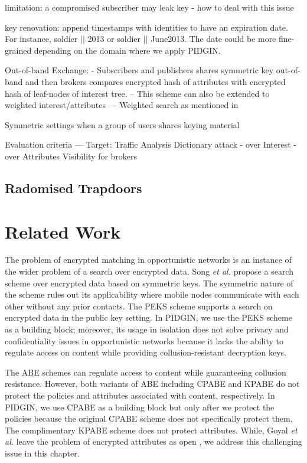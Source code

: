 \documentclass[epsfig,a4paper,11pt,titlepage]{book}
\numberwithin{algorithm}{chapter}
\begin{document}
limitation: a compromised subscriber may leak key - how to deal with this issue

key renovation: append timestamps with identities to have an expiration date.
For instance, soldier $||$ 2013 or soldier $||$ June2013. The date could be more fine-grained depending on the domain where we apply \gls{PIDGIN}. 

Out-of-band Exchange:
- Subscribers and publishers shares symmetric key out-of-band and then brokers compares encrypted hash of attributes with encrypted hash of leaf-nodes of interest tree.
-- This scheme can also be extended to weighted interest/attributes
--- Weighted search as mentioned in \cite{Nordstrom:2009}

Symmetric settings when a group of users shares keying material

Evaluation criteria ---
Target: Traffic Analysis
Dictionary attack
- over Interest
- over Attributes
Visibility for brokers

\subsection{Radomised Trapdoors}

\fi

\section{Related Work}
\label{sec:pidgin-related-work}

The problem of encrypted matching in opportunistic networks is an instance of the wider problem of a search over encrypted data. Song \emph{et al.} \cite{Song:2000} propose a search scheme over encrypted data based on symmetric keys. The symmetric nature of the scheme rules out its applicability where mobile nodes communicate with each other without any prior contacts. The \gls{PEKS} scheme \cite{Boneh:2004} supports a search on encrypted data in the public key setting. In \gls{PIDGIN}, we use the \gls{PEKS} scheme as a building block; moreover, its usage in isolation does not solve privacy and confidentiality issues in opportunistic networks because it lacks the ability to regulate access on content while providing collusion-resistant decryption keys.

The \gls{ABE} schemes can regulate access to content while guaranteeing collusion resistance. However, both variants of \gls{ABE} including \gls{CPABE} \cite{Bethencourt:2007} and \gls{KPABE} \cite{Goyal:2006} do not protect the policies and attributes associated with content, respectively. In \gls{PIDGIN}, we use \gls{CPABE} \cite{Bethencourt:2007} as a building block but only after we protect the policies because the original \gls{CPABE} scheme does not specifically protect them. The complimentary \gls{KPABE} \cite{Goyal:2006} scheme does not protect attributes. While, Goyal \emph{et al.} leave the problem of encrypted attributes as open \cite{Goyal:2006}, we address this challenging issue in this chapter.
\end{document}
